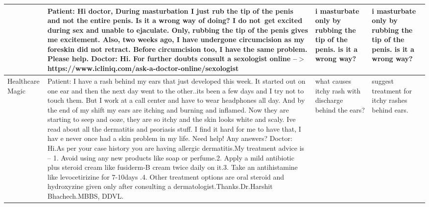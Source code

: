 \documentclass[10pt]{article} \usepackage[preprint]{tmlr}
\begin{document}
\begin{table*}
\begin{tabularx}{\textwidth}{|>{\raggedright\arraybackslash}p{0.7in}|>{\raggedright\arraybackslash}X|>{\raggedright\arraybackslash}p{1.2in}|>{\raggedright\arraybackslash}p{1.2in}|}
    \cline{2-4}
     & Patient: Hi doctor, During masturbation I just rub the tip of the penis and not the entire penis. Is it a wrong way of doing? I do not get excited during sex and unable to ejaculate. Only, rubbing the tip of the penis gives me excitement. Also, two weeks ago, I have undergone circumcision as my foreskin did not retract. Before circumcision too, I have the same problem. Please help. Doctor: Hi. For further doubts consult a sexologist online --$>$https://www.icliniq.com/ask-a-doctor-online/sexologist & i masturbate only by rubbing the tip of the penis. is it a wrong way? & i masturbate only by rubbing the tip of the penis. is it a wrong way? \\
    \hline
    Healthcare Magic & Patient: I have a rash behind my ears that just developed this week. It started out on one ear and then the next day went to the other..its been a few days and I try not to touch them. But I work at a call center and have to wear headphones all day. And by the end of my shift my ears are itching and burning and inflamed. Now they are starting to seep and ooze, they are so itchy and the skin looks white and scaly. Ive read about all the dermatitis and psoriasis stuff. I find it hard for me to have that, I hav e never once had a skin problem in my life. Need help! Any answers? Doctor: Hi.As per your case history you are having allergic dermatitis.My treatment advice is – 1. Avoid using any new products like soap or perfume.2. Apply a mild antibiotic plus steroid cream like fusiderm-B cream twice daily on it.3. Take an antihistamine like levocetirizine for 7-10days .4. Other treatment options are oral steroid and hydroxyzine given only after consulting a dermatologist.Thanks.Dr.Harshit Bhachech.MBBS, DDVL. & what causes itchy rash with discharge behind the ears? & suggest treatment for itchy rashes behind ears. \\
    \hline
    \end{tabularx}
\end{table*}
\end{document}
